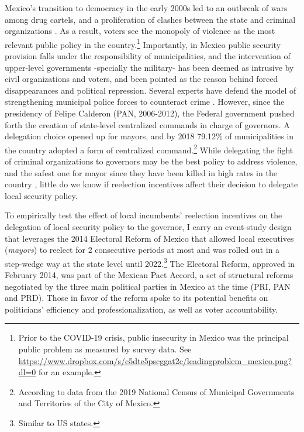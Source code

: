 \documentclass[12pt]{amsart}
\numberwithin{equation}{section}
\theoremstyle{definition}
\theoremstyle{definition}
\theoremstyle{definition}
\begin{document}
Mexico's transition to democracy in the early 2000s led to an outbreak of wars among drug cartels, and a proliferation of clashes between the state and criminal organizations \citep{ley_trejo_2020}. As a result, voters see the monopoly of violence as the most relevant public policy in the country.\footnote{Prior to the COVID-19 crisis, public insecurity in Mexico was the principal public problem as measured by survey data. See \url{https://www.dropbox.com/s/c5dte5pscggat2c/leadingproblem_mexico.png?dl=0} for an example.} Importantly, in Mexico public security provision falls under the responsibility of municipalities, and the intervention of upper-level governments -specially the military- has been deemed as intrusive by civil organizations and voters, and been pointed as the reason behind forced disappearances and political repression. Several experts have defend the model of strengthening municipal police forces to counteract crime \citep{escalante_2011, guerrero_2011}. However, since the presidency of Felipe Calderon (PAN, 2006-2012), the Federal government pushed forth the creation of state-level centralized commands in charge of governors. A delegation choice opened up for mayors, and by 2018 79.12\% of municipalities in the country adopted a form of centralized command.\footnote{According to data from the 2019 National Census of Municipal Governments and Territories of the City of Mexico.} While delegating the fight of criminal organizations to governors may be the best policy to address violence, and the safest one for mayor since they have been killed in high rates in the country \citep{ley_trejo_2020}, little do we know if reelection incentives affect their decision to delegate local security policy. %


   To empirically test the effect of local incumbents' reelection incentives on the delegation of local security policy to the governor, I carry an event-study design that leverages the 2014 Electoral Reform of Mexico that allowed local executives (\emph{mayors}) to reelect for 2 consecutive periods at most and was rolled out in a step-wedge way at the state level until 2022.\footnote{Similar to US states.} The Electoral Reform, approved in February 2014, was part of the Mexican Pact Accord, a set of structural reforms negotiated by the three main political parties in Mexico at the time (PRI, PAN and PRD). Those in favor of the reform spoke to its potential benefits on politicians' efficiency and professionalization, as well as voter accountability. %
     
\end{document}
